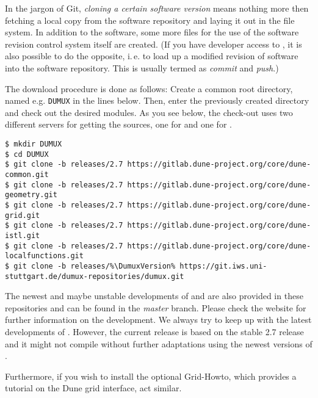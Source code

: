 In the jargon of Git, \emph{cloning a certain software version} means nothing more then fetching
a local copy from the software repository and laying it out in the file system.
In addition to the software, some more files for the use of the software revision
control system itself are created. (If you have developer access to \Dumux, it is
also possible to do the opposite, i.\,e. to load up a modified revision of software
into the software repository. This is usually termed as \emph{commit} and \emph{push}.)

The download procedure is done as follows:
Create a common root directory, named e.g. \texttt{DUMUX} in the lines below.
Then, enter the previously created directory and check out the desired modules.
As you see below, the check-out uses two different servers for getting the sources,
one for \Dune and one for \Dumux.

\begin{lstlisting}[style=Bash,escapechar=\%]
$ mkdir DUMUX
$ cd DUMUX
$ git clone -b releases/2.7 https://gitlab.dune-project.org/core/dune-common.git
$ git clone -b releases/2.7 https://gitlab.dune-project.org/core/dune-geometry.git
$ git clone -b releases/2.7 https://gitlab.dune-project.org/core/dune-grid.git
$ git clone -b releases/2.7 https://gitlab.dune-project.org/core/dune-istl.git
$ git clone -b releases/2.7 https://gitlab.dune-project.org/core/dune-localfunctions.git
$ git clone -b releases/%\DumuxVersion% https://git.iws.uni-stuttgart.de/dumux-repositories/dumux.git
\end{lstlisting}

The newest and maybe unstable developments of \Dune and \Dumux are also provided in these repositories and can be found in the \emph{master} branch.
Please check the \Dune website \cite{DUNE-HP} for further information on the \Dune development. We always try to keep up with the latest developments of \Dune.
However, the current \Dumux release is based on the stable 2.7 release and it might not compile without further adaptations using the newest versions of \Dune.

Furthermore, if you wish to install the optional \Dune Grid-Howto, which provides a tutorial
on the Dune grid interface, act similar.

